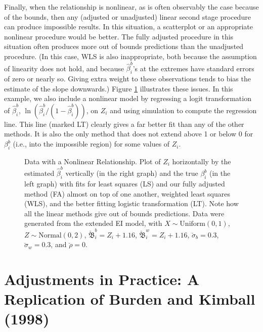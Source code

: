 \documentclass[11pt,titlepage]{article}
\newcommand{\bbeta}{{\mathfrak B}}
\newcommand{\sigmau}{\breve{\sigma}}
\newcommand{\rhou}{\breve{\rho}}
\begin{document}
Finally, when the relationship is nonlinear, as is often observably
the case because of the bounds, then any (adjusted or unadjusted)
linear second stage procedure can produce impossible results.  In this
situation, a scatterplot or an appropriate nonlinear procedure would
be better.  The fully adjusted procedure in this situation often
produces more out of bounds predictions than the unadjusted procedure.
(In this case, WLS is also inappropriate, both because the assumption
of linearity does not hold, and because $\hat\beta_i^b$'s at the
extremes have standard errors of zero or nearly so.  Giving extra
weight to these observations tends to bias the estimate of the slope
downwards.)  Figure \ref{f:nonlinear} illustrates these issues.  In
this example, we also include a nonlinear model by regressing a logit
transformation of $\hat\beta_i^b$,
$\ln(\hat\beta_i^b/(1-\hat\beta_i^b))$, on $Z_i$ and using simulation
to compute the regression line.  This line (marked LT) clearly gives a
far better fit than any of the other methods.  It is also the only
method that does not extend above 1 or below 0 for $\beta_i^b$ (i.e.,
into the impossible region) for some values of $Z_i$.
\begin{figure}[t]
  \begin{center}
    \caption{Data with a Nonlinear Relationship.  Plot of $Z_i$ 
      horizontally by the estimated $\hat\beta_i^b$ vertically (in the
      right graph) and the true $\beta_i^b$ (in the left graph) with
      fits for least squares (LS) and our fully adjusted method (FA)
      almost on top of one another, weighted least squares (WLS), and
      the better fitting logistic transformation (LT).  Note how all
      the linear methods give out of bounds predictions.  Data were
      generated from the extended EI model, with $X \sim
      \textrm{Uniform}(0,1)$, $Z \sim \textrm{Normal}(0,2)$,
      $\breve\bbeta_i^b = Z_i + 1.16$, $\breve\bbeta_i^w = Z_i +
      1.16$, $\sigmau_b = 0.3$, $\sigmau_w = 0.3$, and $\rhou = 0$.}
    \label{f:nonlinear}
  \end{center}
\end{figure}

\section{Adjustments in Practice: A Replication of Burden and Kimball (1998)}
\end{document}
